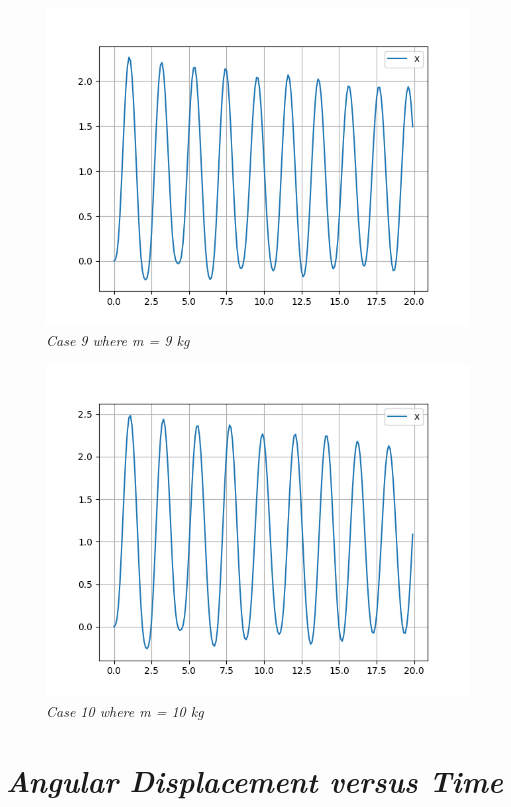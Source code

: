         \begin{figure}[H]
            \centering
            \includegraphics{Appendix/RExpPictures/R/rm9.png}
            \caption{\textit{Case 9 where m = 9 kg}}
            \label{}
        \end{figure}
            
        \begin{figure}[H]
            \centering
            \includegraphics{Appendix/RExpPictures/R/rm10.png}
            \caption{\textit{Case 10 where m = 10 kg}}
            \label{}
        \end{figure}
            
    \section{\textit{Angular Displacement versus Time}}
            
